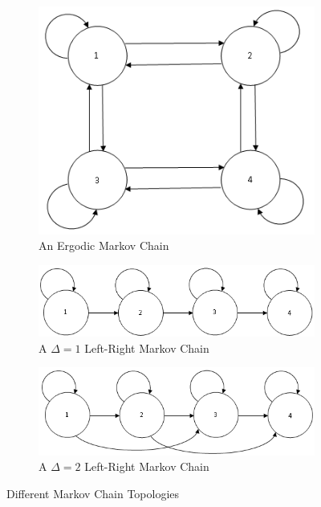 \begin{figure} [h!]
        \centering
        \begin{subfigure}[b]{0.5\textwidth}
                \centering
                \includegraphics[width=1.0\textwidth]{ThesisFigs/erdogicMC}
                \caption{An Ergodic Markov Chain}
                \label{fig:unclust}
        \end{subfigure} 
        \begin{subfigure}[b]{0.5\textwidth}
                \centering
                \includegraphics[width=1.0\textwidth]{ThesisFigs/del1LRMC}
                \caption{A $\Delta = 1$ Left-Right Markov Chain}
                \label{fig:clust}
        \end{subfigure}
	   \begin{subfigure}[b]{0.5\textwidth}
                \centering
                \includegraphics[width=1.0\textwidth]{ThesisFigs/del2LRMC}
                \caption{A $\Delta = 2$ Left-Right Markov Chain}
                \label{fig:clust}
        \end{subfigure}
        \caption{Different Markov Chain Topologies}\label{fig:mctop}
\end{figure}

